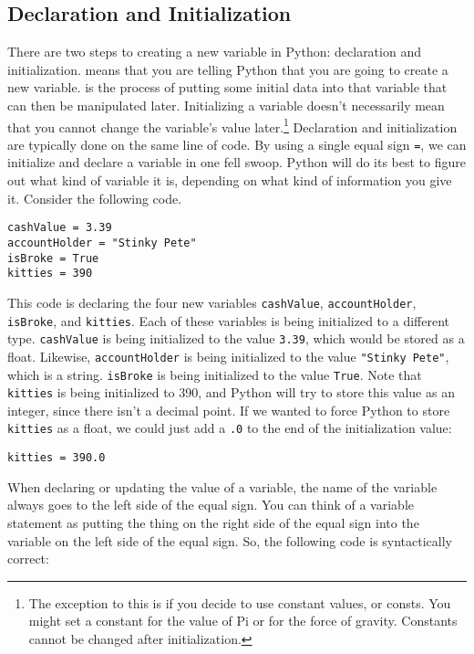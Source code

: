 \subsection{Declaration and Initialization}
There are two steps to creating a new variable in Python: declaration and initialization.  means that you are telling Python that you are going to create a new variable.  is the process of putting some initial data into that variable that can then be manipulated later. Initializing a variable doesn't necessarily mean that you cannot change the variable's value later.\footnote{The exception to this is if you decide to use constant values, or consts. You might set a constant for the value of Pi or for the force of gravity. Constants cannot be changed after initialization.} Declaration and initialization are typically done on the same line of code. By using a single equal sign \verb|=|, we can initialize and declare a variable in one fell swoop. Python will do its best to figure out what kind of variable it is, depending on what kind of information you give it. Consider the following code.\par
\begin{lstlisting}[style=pippython]
cashValue = 3.39
accountHolder = "Stinky Pete"
isBroke = True
kitties = 390
\end{lstlisting}
This code is declaring the four new variables \verb|cashValue|, \verb|accountHolder|, \verb|isBroke|, and \verb|kitties|. Each of these variables is being initialized to a different type. \verb|cashValue| is being initialized to the value \verb|3.39|, which would be stored as a float. Likewise, \verb|accountHolder| is being initialized to the value \verb|"Stinky Pete"|, which is a string. \verb|isBroke| is being initialized to the  value \verb|True|. Note that \verb|kitties| is being initialized to 390, and Python will try to store this value as an integer, since there isn't a decimal point. If we wanted to force Python to store \verb|kitties| as a float, we could just add a \verb|.0| to the end of the initialization value:\par
\begin{lstlisting}[style=pippython]
kitties = 390.0
\end{lstlisting}
When declaring or updating the value of a variable, the name of the variable always goes to the left side of the equal sign. You can think of a variable statement as putting the thing on the right side of the equal sign into the variable on the left side of the equal sign. So, the following code is syntactically correct:
